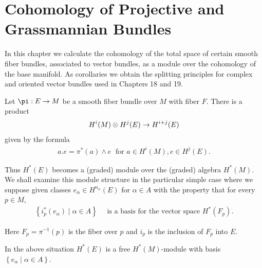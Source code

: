 \chapter[Cohomology of Projective and Grassmannian Bundles]{Cohomology of Projective and\\ Grassmannian Bundles}
In this chapter we calculate the cohomology of the total space of certain smooth fiber bundles, 
associated to vector bundles, as a module over the cohomology of the base manifold. 
As corollaries we obtain the splitting principles for complex and oriented vector 
bundles used in Chapters 18 and 19.

Let $\pi:E\ra M$ be a smooth fiber bundle over $M$ with fiber $F$. There is a product
\[
  H^{i}( M)  \otimes  H^{j}( E)  \rightarrow  H^{i + j}( E)
\]
given by the formula
\begin{align}\label{eq:20-1}
  a.e = {\pi }^*( a)  \land  e\;\text{ for }a \in  H^{i}( M),e \in  H^{j}( E).
\end{align}

Thus $H^*( E)$ becomes a (graded) module over the (graded) algebra $H^*( M)$. We shall examine 
this module structure in the particular simple case where we suppose given classes ${e}_{\alpha } \in  H^{{n}_{\alpha }}( E)$ 
for $\alpha \in  A$ with the property that for every $p \in  M$,
\begin{align}\label{eq:20-2}
  \left\{  {{i}_{p}^*( {e}_{\alpha })  \mid  \alpha  \in  A}\right\}  
  \quad
  \text{ is a basis for the vector space }H^*( {F}_{p}).
\end{align}

Here ${F}_{p} = {\pi }^{-1}( p)$ is the fiber over $p$ and ${i}_{p}$ is the inclusion of ${F}_{p}$ into $E$.

\begin{theorem}\label{theorem:20-1}
  In the above situation $H^*( E)$ is a free $H^*( M)$-module with basis $\left\{  {{e}_{\alpha } \mid  \alpha  \in  A}\right\}$.  
\end{theorem}

